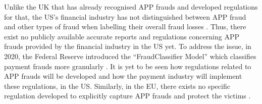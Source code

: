 Unlike the UK that has already recognised APP frauds and developed regulations for that,  the US's financial industry has not distinguished between APP fraud and other types of fraud when labelling their overall fraud losses \cite{P20-report}. Thus, there exist no publicly available accurate reports and regulations concerning APP frauds provided by the financial industry in the US yet.  To address the issue, in 2020, the Federal Reserve introduced the ``FraudClassifier Model'' which classifies payment frauds more granularly \cite{Fraud-Classifier}. It is yet to be seen how regulations related to APP frauds will be developed and how the payment industry will implement these regulations, in the US. Similarly, in the EU, there  exists no specific regulation developed 
%
%
%
to explicitly capture APP frauds and protect the victims \cite{kjorven2020pays,McIlroy2021}.



















